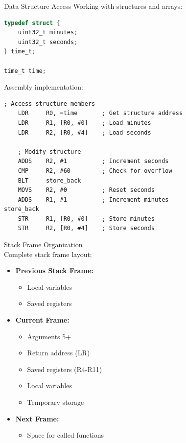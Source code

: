 \begin{example2}{Data Structure Access}
Working with structures and arrays:
\begin{lstlisting}[language=C, style=base]
typedef struct {
    uint32_t minutes;
    uint32_t seconds;
} time_t;

time_t time;
\end{lstlisting}

Assembly implementation:
\begin{lstlisting}[language=armasm, style=base]
    ; Access structure members
    LDR     R0, =time       ; Get structure address
    LDR     R1, [R0, #0]    ; Load minutes
    LDR     R2, [R0, #4]    ; Load seconds
    
    ; Modify structure
    ADDS    R2, #1          ; Increment seconds
    CMP     R2, #60         ; Check for overflow
    BLT     store_back
    MOVS    R2, #0          ; Reset seconds
    ADDS    R1, #1          ; Increment minutes
store_back
    STR     R1, [R0, #0]    ; Store minutes
    STR     R2, [R0, #4]    ; Store seconds
\end{lstlisting}
\end{example2}

\begin{concept}{Stack Frame Organization}\\
Complete stack frame layout:

\begin{itemize}
  \item \textbf{Previous Stack Frame:}
    \begin{itemize}
      \item Local variables
      \item Saved registers
    \end{itemize}
  \item \textbf{Current Frame:}
    \begin{itemize}
      \item Arguments 5+
      \item Return address (LR)
      \item Saved registers (R4-R11)
      \item Local variables
      \item Temporary storage
    \end{itemize}
  \item \textbf{Next Frame:}
    \begin{itemize}
      \item Space for called functions
    \end{itemize}
\end{itemize}
\end{concept}

